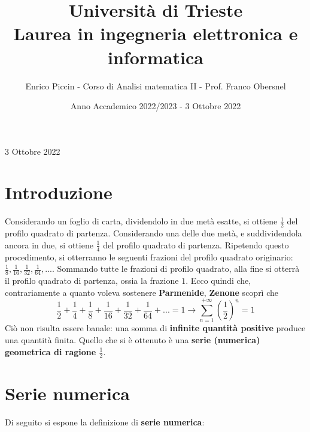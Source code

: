 \documentclass[a4paper]{extarticle}
\title{\textbf{Università di Trieste\\ \vspace{1em}
Laurea in ingegneria elettronica e informatica}}
\author{Enrico Piccin - Corso di Analisi matematica II - Prof. Franco Obersnel}
\date{Anno Accademico 2022/2023 - 3 Ottobre 2022}
\begin{document}
\vspace{-10mm}
\maketitle

\tableofcontents
\newpage
\noindent
\begin{center}
    3 Ottobre 2022
\end{center}

\vspace{1em}
\noindent
\section{Introduzione}
Considerando un foglio di carta, dividendolo in due metà esatte, si ottiene $\frac{1}{2}$ del profilo quadrato di partenza. Considerando una delle due metà, e suddividendola ancora in due, si ottiene $\frac{1}{4}$ del profilo quadrato di partenza.
Ripetendo questo procedimento, si otterranno le seguenti frazioni del profilo quadrato originario: $\frac{1}{8}, \frac{1}{16}, \frac{1}{32}, \frac{1}{64}, ...$. Sommando tutte le frazioni di profilo quadrato, alla fine si otterrà il profilo quadrato di partenza, ossia la frazione $1$.
Ecco quindi che, contrariamente a quanto voleva sostenere \textbf{Parmenide}, \textbf{Zenone} scoprì che
\[\boxed{\frac{1}{2}+\frac{1}{4}+\frac{1}{8}+\frac{1}{16}+\frac{1}{32}+\frac{1}{64}+...=1 \rightarrow \sum_{n=1}^{+\infty} \left(\frac{1}{2}\right)^n=1}\]
Ciò non risulta essere banale: una somma di \textbf{infinite quantità positive} produce una quantità finita. Quello che si è ottenuto è una \textbf{serie (numerica) geometrica di ragione $\frac{1}{2}$}.

\vspace{1em}
\section{Serie numerica}
Di seguito si espone la definizione di \textbf{serie numerica}:
\end{document}

